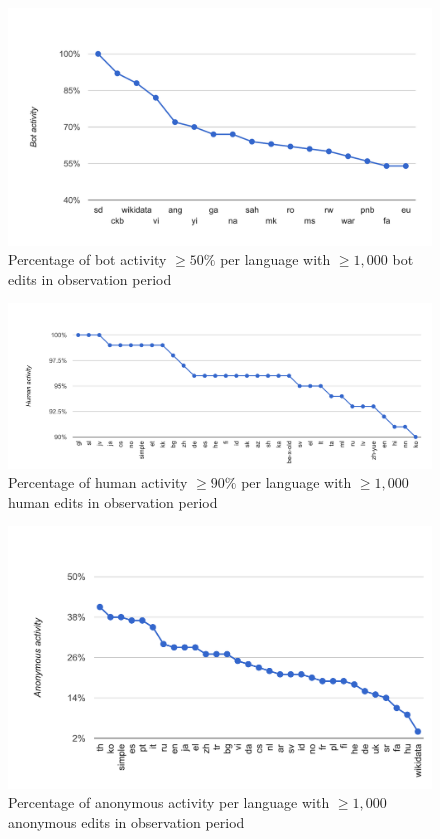 \documentclass{sig-alternate}
\begin{document}
\begin{figure}[p]
  \center
  \includegraphics[width=\linewidth]{most-bot-edited-languages.pdf}
  \caption{Percentage of bot activity $\geq50\%$ per language with $\geq1,000$ bot edits in observation period}
  \label{fig:most-bot-edited-languages}
\end{figure}

\begin{figure}[p]
  \center
  \includegraphics[width=\linewidth]{most-human-edited-languages.pdf}
  \caption{Percentage of human activity $\geq90\%$ per language with $\geq1,000$ human edits in observation period}
  \label{fig:most-human-edited-languages}
\end{figure}

\begin{figure}[p]
  \center
  \includegraphics[width=\linewidth]{most-anonymous-edited-languages.pdf}
  \caption{Percentage of anonymous activity per language with $\geq1,000$ anonymous edits in observation period}
  \label{fig:most-anonymous-edited-languages}
\end{figure}
\end{document}
